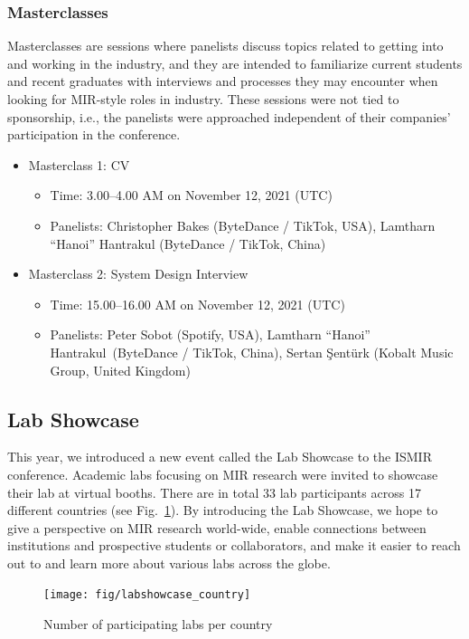 \documentclass[%
10pt,								%
titlepage,						%
]
{scrartcl}
\begin{document}
        \subsubsection{Masterclasses}
            Masterclasses are sessions where panelists discuss topics related to getting into and working in the industry, and they are intended to familiarize current students and recent graduates with interviews and processes they may encounter when looking for MIR-style roles in industry. These sessions were not tied to sponsorship, i.e., the panelists were approached independent of their companies' participation in the conference.
             \begin{itemize}
                \item Masterclass 1: CV
                    \begin{itemize}
                        \item   Time: 3.00--4.00 AM on November 12, 2021 (UTC)
                        \item   Panelists: Christopher Bakes (ByteDance / TikTok, USA), Lamtharn ``Hanoi'' Hantrakul (ByteDance / TikTok, China)
                    \end{itemize}
                \item Masterclass 2: System Design Interview
                    \begin{itemize}
                        \item   Time: 15.00--16.00 AM on November 12, 2021 (UTC)
                        \item   Panelists: Peter Sobot (Spotify, USA), Lamtharn ``Hanoi'' Hantrakul~(ByteDance / TikTok, China), Sertan \c{S}ent\"urk (Kobalt Music Group, United Kingdom)
                    \end{itemize}
            \end{itemize}
    
    \subsection{Lab Showcase}
        This year, we introduced a new event called the Lab Showcase to the ISMIR conference. Academic labs focusing on MIR research were invited to showcase their lab at virtual booths. There are in total 33 lab participants across 17 different countries (see Fig.~\ref{fig:labshowcase_country}). By introducing the Lab Showcase, we hope to give a perspective on MIR research world-wide, enable connections between institutions and prospective students or collaborators, and make it easier to reach out to and learn more about various labs across the globe.
        \begin{figure}%
            \centering
            \texttt{[image: fig/labshowcase\_country]}%
            \caption{Number of participating labs per country}%
            \label{fig:labshowcase_country}%
        \end{figure}
        
\end{document}
